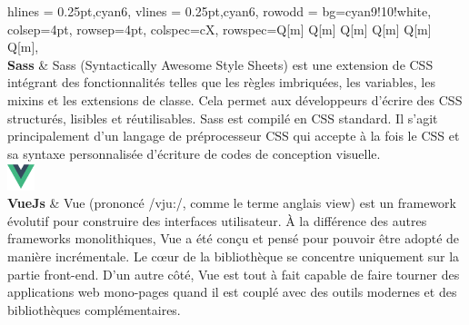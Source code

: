 \begin{longtblr}[caption={Technologies utilisées au niveau du front-end}]{
    hlines = {0.25pt,cyan6},
    vlines = {0.25pt,cyan6},
    row{odd} = {bg=cyan9!10!white},
    colsep=4pt,
    rowsep=4pt,
	colspec={cX},
    rowspec={Q[m] Q[m] Q[m] Q[m] Q[m] Q[m]},
}
{ \\\textbf{Sass}
 }
 & Sass (Syntactically Awesome Style Sheets) est une extension de CSS intégrant des fonctionnalités telles que les règles imbriquées, les variables, les mixins et les extensions de classe. Cela permet aux développeurs d'écrire des CSS structurés, lisibles et réutilisables. Sass est compilé en CSS standard. Il s'agit principalement d'un langage de préprocesseur CSS qui accepte à la fois le CSS et sa syntaxe personnalisée d'écriture de codes de conception visuelle.\\
{\includegraphics[width=8mm]{images/vuejs.png} \\\textbf{VueJs}
} & Vue (prononcé /vju:/, comme le terme anglais view) est un framework évolutif pour construire des interfaces utilisateur. À la différence des autres frameworks monolithiques, Vue a été conçu et pensé pour pouvoir être adopté de manière incrémentale. Le cœur de la bibliothèque se concentre uniquement sur la partie front-end. D’un autre côté, Vue est tout à fait capable de faire tourner des applications web mono-pages quand il est couplé avec des outils modernes et des bibliothèques complémentaires.\\
\end{longtblr}

